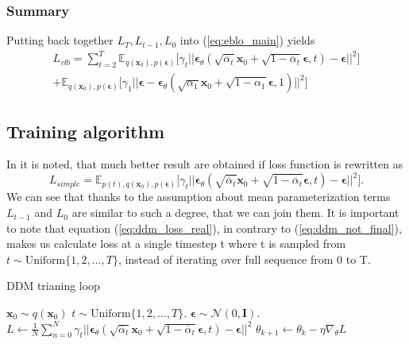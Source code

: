 \documentclass[10pt]{article}
\begin{document}
\subsubsection{Summary}
Putting back together $L_T, L_{t-1}, L_0$ into (\ref{eq:eblo_main}) yields
\begin{equation}
\begin{gathered}
\label{eq:ddm_not_final}
         L_{vlb} = \sum_{t=2}^{T} \mathbb{E}_{q(\textbf{x}_{0}), p(\bm{\epsilon})}\Big[
      \gamma_t ||\bm{\epsilon}_{\theta}(\sqrt{\overline{\alpha}_t}\textbf{x}_{0} + \sqrt{1 - \overline{\alpha}_t}\bm{\epsilon}, t) - \bm{\epsilon} ||^2
      \Big] \\
        + \mathbb{E}_{q(\textbf{x}_{0}), p(\bm{\epsilon})} 
    \Bigg[ \gamma_1 || \bm{\epsilon} -
    \bm{\epsilon}_{\theta}(\sqrt{\alpha_1}\textbf{x}_{0} + \sqrt{1 - \alpha_1}\bm{\epsilon}, 1) ||^2 \Bigg] 
\end{gathered}
\end{equation}
\subsection{Training algorithm}
In \cite{ddm} it is noted, that much better result are obtained if loss function is rewritten as
\begin{equation}
\label{eq:ddm_loss_real}
    L_{simple} = \mathbb{E}_{p(t),q(\textbf{x}_{0}), p(\bm{\epsilon})}\Big[
      \gamma_t ||\bm{\epsilon}_{\theta}(\sqrt{\overline{\alpha}_t}\textbf{x}_{0} + \sqrt{1 - \overline{\alpha}_t}\bm{\epsilon}, t) - \bm{\epsilon} ||^2
      \Big].
\end{equation}
We can see that thanks to the assumption about mean parameterization terms $L_{t-1}$ and $L_0$ are similar to such a degree, that we can join them. It is important to note that equation (\ref{eq:ddm_loss_real}), in contrary to (\ref{eq:ddm_not_final}), makes us calculate loss at a single timestep t where t is sampled from $t \sim \text{Uniform}\{1, 2, ... , T \}$, instead of iterating over full sequence from 0 to T.

\begin{algorithm} [H]
\caption{DDM trianing loop}\label{alg:cap}
\begin{algorithmic}
    \State $\textbf{x}_0 \sim q(\textbf{x}_0)$
    \State $t \sim \text{Uniform}\{1, 2, ... , T \}$.
    \State $\bm{\epsilon} \sim \mathcal{N}(0, \mathbf{I})$.
    \State $L \gets \frac{1}{N}\sum_{n = 0}^N  \gamma_t ||\bm{\epsilon}_{\theta}(\sqrt{\overline{\alpha}_t}\textbf{x}_{0} + \sqrt{1 - \overline{\alpha}_t}\bm{\epsilon}, t) - \bm{\epsilon} ||^2$
    \State $\theta_{k+1}\gets \theta_{k} - \eta \nabla_{\theta}L$
    \EndWhile
\end{algorithmic}
\end{algorithm}
\end{document}
